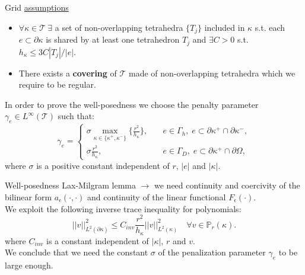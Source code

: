 \documentclass{beamer}
\begin{document}
\begin{frame}[label=main]{Grid \hyperlink{supplemental}{assumptions}}
	\begin{itemize}
	\item $\forall \kappa \in \mathcal{T}~\exists$ a set of non-overlapping 
	tetrahedra $\{T_j\}$ included in $\kappa$ s.t. each $ e \subset \partial 
	\kappa$ is shared by at least one tetrahedron $T_j$ and $\exists C > 0$ 
	s.t. $h_\kappa \leq 3C|T_j|/|e|$. 
	\item There exists a \textbf{covering} of $\mathcal{T}$ made of 
	non-overlapping	tetrahedra which we require to be regular.
	\end{itemize}
	\vspace*{0.3cm}
	In order to prove the well-posedness we choose the penalty parameter
	$\gamma_e \in L^\infty(\mathcal{T})$ such that:
	\begin{equation*} \label{eq:penalty}
	\gamma_e =
	\begin{cases}
	\sigma \max\limits_{\kappa \in \{\kappa^+, \kappa^-\}} \big\{
	\frac{r^2}{h_\kappa}\big\},
	& \quad e \in \Gamma_h, \; e \subset \partial\kappa^+ \cap
	\partial\kappa^-,\\
	\sigma\frac{r^2}{h_\kappa},& \quad e \in \Gamma_D, \; e \subset
	\partial\kappa^+ \cap \partial\Omega,
	\end{cases}
	\end{equation*}
	where $\sigma$ is a positive constant independent of $r$, $|e|$ and
	$|\kappa|$.
\end{frame}
\begin{frame}{Well-posedness}
	Lax-Milgram lemma $\rightarrow$ we need continuity and coercivity of the
	bilinear form $a_\epsilon (\cdot, \cdot)$ and continuity of the linear
	functional $F_\epsilon(\cdot)$.\\
	\vspace*{0.5cm}
	We exploit the following inverse trace inequality for polynomials:
	\begin{equation*}
		|\!|v|\!|^2_{L^2(\partial\kappa)} \leq C_{inv} \frac{r^2}{h_\kappa} 
		|\!|v|\!|^2_{L^2(\kappa)} \quad \forall v \in \mathbb{P}_r(\kappa).
	\end{equation*}
	where $C_{inv}$ is a constant independent of $|\kappa|$, $r$ and $v$.\\
	\vspace*{0.5cm}
	We conclude that we need the constant $\sigma$ of the penalization 
	parameter $\gamma_e$ to be large enough.
\end{frame}
\end{document}
